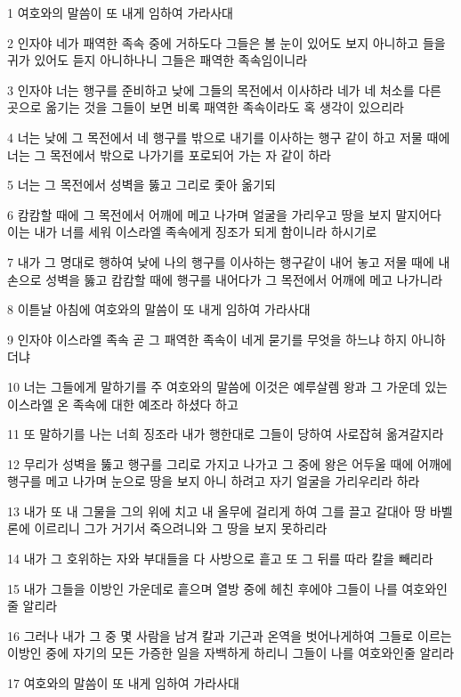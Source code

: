 \par 1 여호와의 말씀이 또 내게 임하여 가라사대
\par 2 인자야 네가 패역한 족속 중에 거하도다 그들은 볼 눈이 있어도 보지 아니하고 들을 귀가 있어도 듣지 아니하나니 그들은 패역한 족속임이니라
\par 3 인자야 너는 행구를 준비하고 낮에 그들의 목전에서 이사하라 네가 네 처소를 다른 곳으로 옮기는 것을 그들이 보면 비록 패역한 족속이라도 혹 생각이 있으리라
\par 4 너는 낮에 그 목전에서 네 행구를 밖으로 내기를 이사하는 행구 같이 하고 저물 때에 너는 그 목전에서 밖으로 나가기를 포로되어 가는 자 같이 하라
\par 5 너는 그 목전에서 성벽을 뚫고 그리로 좇아 옮기되
\par 6 캄캄할 때에 그 목전에서 어깨에 메고 나가며 얼굴을 가리우고 땅을 보지 말지어다 이는 내가 너를 세워 이스라엘 족속에게 징조가 되게 함이니라 하시기로
\par 7 내가 그 명대로 행하여 낮에 나의 행구를 이사하는 행구같이 내어 놓고 저물 때에 내 손으로 성벽을 뚫고 캄캄할 때에 행구를 내어다가 그 목전에서 어깨에 메고 나가니라
\par 8 이튿날 아침에 여호와의 말씀이 또 내게 임하여 가라사대
\par 9 인자야 이스라엘 족속 곧 그 패역한 족속이 네게 묻기를 무엇을 하느냐 하지 아니하더냐
\par 10 너는 그들에게 말하기를 주 여호와의 말씀에 이것은 예루살렘 왕과 그 가운데 있는 이스라엘 온 족속에 대한 예조라 하셨다 하고
\par 11 또 말하기를 나는 너희 징조라 내가 행한대로 그들이 당하여 사로잡혀 옮겨갈지라
\par 12 무리가 성벽을 뚫고 행구를 그리로 가지고 나가고 그 중에 왕은 어두울 때에 어깨에 행구를 메고 나가며 눈으로 땅을 보지 아니 하려고 자기 얼굴을 가리우리라 하라
\par 13 내가 또 내 그물을 그의 위에 치고 내 올무에 걸리게 하여 그를 끌고 갈대아 땅 바벨론에 이르리니 그가 거기서 죽으려니와 그 땅을 보지 못하리라
\par 14 내가 그 호위하는 자와 부대들을 다 사방으로 흩고 또 그 뒤를 따라 칼을 빼리라
\par 15 내가 그들을 이방인 가운데로 흩으며 열방 중에 헤친 후에야 그들이 나를 여호와인 줄 알리라
\par 16 그러나 내가 그 중 몇 사람을 남겨 칼과 기근과 온역을 벗어나게하여 그들로 이르는 이방인 중에 자기의 모든 가증한 일을 자백하게 하리니 그들이 나를 여호와인줄 알리라
\par 17 여호와의 말씀이 또 내게 임하여 가라사대
